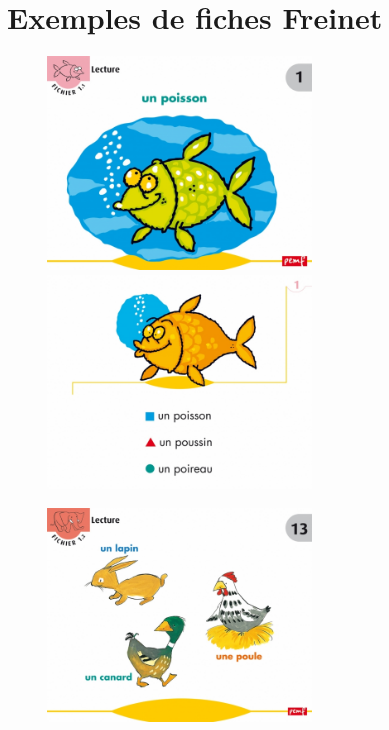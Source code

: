 \section{Exemples de fiches Freinet}
\label{annexeFreinet}
\begin{center}
\begin{figure}[h]
   \begin{minipage}[c]{.46\linewidth}
      \includegraphics[width=7cm]{img/GSCP_f1recto.jpg}
   \end{minipage}  
   \begin{minipage}[c]{.46\linewidth}
      \includegraphics[width=7cm]{img/GSCP_f1verso.jpg}
   \end{minipage}
\end{figure}
\vline
\vline
\begin{figure}[h]
   \begin{minipage}[c]{.46\linewidth}
      \includegraphics[width=7cm]{img/CP_niv2_f13recto.jpg}

\end{minipage}
\end{figure}
\end{center}
